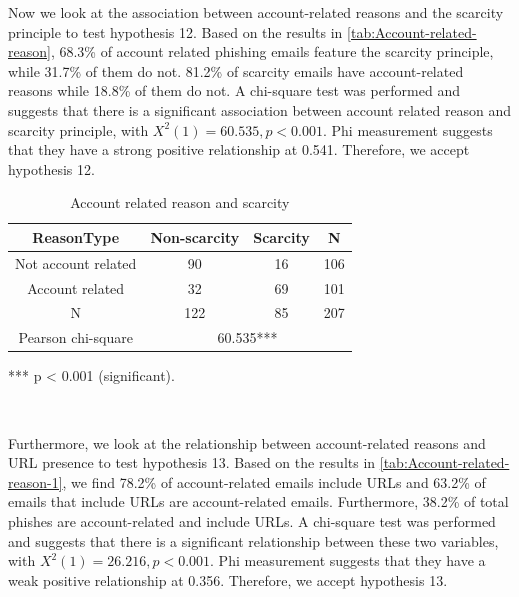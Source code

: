 Now we look at the association between account-related reasons and
the scarcity principle to test hypothesis 12. Based on the results
in \autoref{tab:Account-related-reason}, 68.3\% of account related
phishing emails feature the scarcity principle, while 31.7\% of them
do not. 81.2\% of scarcity emails have account-related reasons while
18.8\% of them do not. A chi-square test was performed and suggests
that there is a significant association between account related reason
and scarcity principle, with $X^{2}(1)=60.535,p<0.001$. Phi measurement
suggests that they have a strong positive relationship at 0.541. Therefore,
we accept hypothesis 12.

\begin{minipage}[t]{1\columnwidth}%
\begin{longtable}{cccc}
\caption{\label{tab:Account-related-reason}Account related reason and scarcity}
\tabularnewline
\toprule 
{\footnotesize{}ReasonType} & {\footnotesize{}Non-scarcity} & {\footnotesize{}Scarcity} & \multirow{1}{*}{{\footnotesize{}N}}\tabularnewline
\midrule 
\multirow{1}{*}{{\footnotesize{}Not account related}} & {\footnotesize{}90} & {\footnotesize{}16} & \multirow{1}{*}{{\footnotesize{}106}}\tabularnewline
\midrule 
\multirow{1}{*}{{\footnotesize{}Account related}} & {\footnotesize{}32} & {\footnotesize{}69} & \multirow{1}{*}{{\footnotesize{}101}}\tabularnewline
\midrule
\midrule 
{\footnotesize{}N} & {\footnotesize{}122} & {\footnotesize{}85} & {\footnotesize{}207}\tabularnewline
\midrule
\midrule 
{\footnotesize{}Pearson chi-square} & \multicolumn{3}{c}{{\footnotesize{}60.535{*}{*}{*}}}\tabularnewline
\midrule
\end{longtable}%
\end{minipage}

{*}{*}{*} p < 0.001 (significant).

\ 

Furthermore, we look at the relationship between account-related reasons
and URL presence to test hypothesis 13. Based on the results in \autoref{tab:Account-related-reason-1},
we find 78.2\% of account-related emails include URLs and 63.2\% of
emails that include URLs are account-related emails. Furthermore,
38.2\% of total phishes are account-related and include URLs. A chi-square
test was performed and suggests that there is a significant relationship
between these two variables, with $X^{2}(1)=26.216,p<0.001$. Phi
measurement suggests that they have a weak positive relationship at
0.356. Therefore, we accept hypothesis 13.

